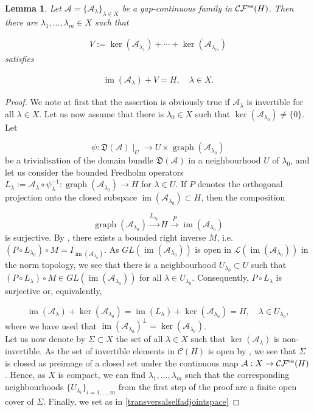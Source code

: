 \documentclass[a4paper,10pt]{article}
\newtheorem{lemma}[theorem]{Lemma}
\DeclareMathOperator{\im}{im}
\DeclareMathOperator{\gra}{graph}
\begin{document}
\begin{lemma}\label{kerneltransversal}
Let $\mathcal{A}=\{\mathcal{A}_\lambda\}_{\lambda\in X}$ be a gap-continuous family in $\mathcal{CF}^\textup{sa}(H)$. Then there are $\lambda_1,\ldots,\lambda_m\in X$ such that

\begin{align}\label{transversalselfadjointspace}
V:=\ker(\mathcal{A}_{\lambda_1})+\cdots +\ker(\mathcal{A}_{\lambda_m})
\end{align}
satisfies

\begin{align}\label{transversalselfadjoint}
\im(\mathcal{A}_\lambda)+V=H,\quad \lambda\in X.
\end{align}
\end{lemma}

\begin{proof}
We note at first that the assertion is obviously true if $\mathcal{A}_\lambda$ is invertible for all $\lambda\in X$. Let us now assume that there is $\lambda_0\in X$ such that $\ker(\mathcal{A}_{\lambda_0})\neq\{0\}$. Let 

\[\psi:\mathfrak{D}(\mathcal{A})\mid_U\rightarrow U\times\gra(\mathcal{A}_{\lambda_0})\]
be a trivialisation of the domain bundle $\mathfrak{D}(\mathcal{A})$ in a neighbourhood $U$ of $\lambda_0$, and let us consider the bounded Fredholm operators $L_\lambda:=\mathcal{A}_\lambda\circ\psi^{-1}_\lambda:\gra(\mathcal{A}_{\lambda_0})\rightarrow H$ for $\lambda\in U$. If $P$ denotes the orthogonal projection onto the closed subspace $\im(\mathcal{A}_{\lambda_0})\subset H$, then the composition

\[\gra(\mathcal{A}_{\lambda_0})\xrightarrow{L_{\lambda_0}} H\xrightarrow{P}\im(\mathcal{A}_{\lambda_0})\]
is surjective. By \cite[Thm. XI.6.1]{Gohberg}, there exists a bounded right inverse $M$, i.e. $(P\circ L_{\lambda_0})\circ M=I_{\im(\mathcal{A}_{\lambda_0})}$. As $GL(\im(\mathcal{A}_{\lambda_0}))$ is open in $\mathcal{L}(\im(\mathcal{A}_{\lambda_0}))$ in the norm topology, we see that there is a neighbourhood $U_{\lambda_0}\subset U$ such that $(P\circ L_\lambda)\circ M\in GL(\im(\mathcal{A}_{\lambda_0}))$ for all $\lambda\in U_{\lambda_0}$. Consequently, $P\circ L_\lambda$ is surjective or, equivalently,

\[\im(\mathcal{A}_\lambda) +\ker(\mathcal{A}_{\lambda_0})=\im(L_\lambda)+\ker(\mathcal{A}_{\lambda_0})=H,\quad\lambda\in U_{\lambda_0},\]
where we have used that $\im(\mathcal{A}_{\lambda_0})^\perp=\ker(\mathcal{A}_{\lambda_0})$.\\
Let us now denote by $\Sigma\subset X$ the set of all $\lambda\in X$ such that $\ker(\mathcal{A}_\lambda)$ is non-invertible. As the set of invertible elements in $\mathcal{C}(H)$ is open by \cite[Thm. IV.5.2.21]{Kato}, we see that $\Sigma$ is closed as preimage of a closed set under the continuous map $\mathcal{A}:X\rightarrow\mathcal{CF}^\textup{sa}(H)$. Hence, as $X$ is compact, we can find $\lambda_1,\ldots,\lambda_m$ such that the corresponding neighbourhoods $\{U_{\lambda_i}\}_{i=1,\ldots,m}$ from the first step of the proof are a finite open cover of $\Sigma$. Finally, we set as in \eqref{transversalselfadjointspace}


\end{proof}
\end{document}
